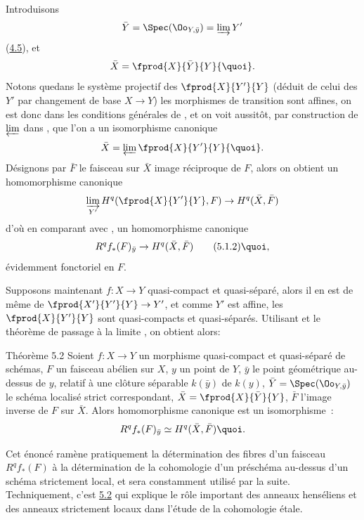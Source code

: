 \documentclass[10pt]{../fichiers-configuration-latex/smfart}
\begin{document}
Introduisons
$$
\bar{Y} = \Spec (\Oo_{Y, \bar{y}}) = \varinjlim Y'
$$
(\cf \hyperref[VIII.subsec4.5]{4.5}), et
$$
\bar{X} = \fprod{X}{\bar{Y}}{Y}{\quoi}.
$$
Notons que\pageoriginale dans le système projectif des
$\fprod{X}{Y'}{Y}$ (déduit
de celui des $Y'$ par changement de base $X \to Y$) les morphismes de
transition sont affines, on est donc dans les conditions générales de
, et on voit aussitôt, par construction de $\varprojlim$ dans
\loccit, que l'on a un isomorphisme canonique
$$
\bar{X} = \varprojlim \fprod{X}{Y'}{Y}{\quoi}.
$$
Désignons par $\bar{F}$ le faisceau sur $\bar{X}$ image réciproque de
$F$, alors on obtient un homomorphisme canonique
$$
\varinjlim_{Y'} H^q (\fprod{X}{Y'}{Y}, F) \to H^q (\bar{X}, \bar{F})
$$
d'où en comparant avec , un homomorphisme canonique
\begin{equation*}
R^q f_{\ast} (F)_{\bar{y}} \to H^q (\bar{X}, \bar{F})\tag{5.1.2}{\quoi},
\end{equation*}
évidemment fonctoriel en $F$.

Supposons maintenant $f : X \to Y$ quasi-compact et quasi-séparé,
alors il en est de même de $\fprod{X'}{Y'}{Y} \to Y'$, et comme $Y'$
est affine, les $\fprod{X}{Y'}{Y}$ sont quasi-compacts et
quasi-séparés. Utilisant  et le théorème de passage à la limite
, on obtient alors:

\begin{enonce*}{Théorème 5.2}
Soient $f : X \to Y$ un morphisme quasi-compact et quasi-séparé de
schémas, $F$ un faisceau abélien sur $X$, $y$ un point de $Y$,
$\bar{y}$ le point géométrique au-dessus de $y$, relatif
à une clôture séparable $k(\bar{y})$ de $k(y)$, $\bar{Y} = \Spec
(\Oo_{Y,\bar{y}})$ le schéma localisé strict correspondant, $\bar{X} =
  \fprod{X}{\bar{Y}}{Y}$, $\bar{F}$ l'image inverse de $F$ sur
  $\bar{X}$. Alors homomorphisme canonique  est un
  isomorphisme :
$$
R^q f_{\ast}(F)_{\bar{y}} \simeq H^q (\bar{X}, \bar{F}){\quoi}.
$$
\end{enonce*}

Cet énoncé ramène pratiquement la détermination des fibres d'un
faisceau\pageoriginale $R^q f_{\ast}(F)$ à la détermination de la
cohomologie
d'un préschéma au-dessus d'un schéma
strictement local, et sera constamment utilisé par la
suite. Techniquement, c'est \hyperref[VIII.thm5.2]{5.2} qui explique le rôle important des
anneaux henséliens et des anneaux strictement locaux dans l'étude de
la cohomologie étale.
\end{document}
